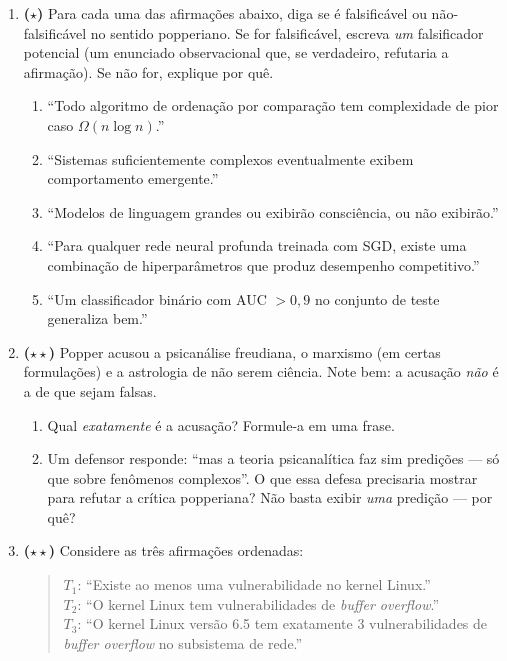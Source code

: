 \documentclass[10pt,a4paper]{extarticle}
\newcommand{\impt}[1]{\textcolor{important}{#1}}
\newcommand{\difi}{$\star$}
\newcommand{\difii}{$\star\star$}
\begin{document}
\begin{enumerate}[label=\textbf{\arabic*.}, leftmargin=*, start=5]

\item \textbf{(\difi)} Para cada uma das afirmações abaixo, diga se é \impt{falsificável} ou \impt{não-falsificável} no sentido popperiano. Se for falsificável, escreva \emph{um} falsificador potencial (um enunciado observacional que, se verdadeiro, refutaria a afirmação). Se não for, explique por quê.

\begin{enumerate}[label=(\alph*)]
    \item ``Todo algoritmo de ordenação por comparação tem complexidade de pior caso $\Omega(n \log n)$.''
    \item ``Sistemas suficientemente complexos eventualmente exibem comportamento emergente.''
    \item ``Modelos de linguagem grandes ou exibirão consciência, ou não exibirão.''
    \item ``Para qualquer rede neural profunda treinada com SGD, existe uma combinação de hiperparâmetros que produz desempenho competitivo.''
    \item ``Um classificador binário com AUC $> 0{,}9$ no conjunto de teste generaliza bem.''
\end{enumerate}

\item \textbf{(\difii)} Popper acusou a psicanálise freudiana, o marxismo (em certas formulações) e a astrologia de não serem ciência. Note bem: a acusação \emph{não} é a de que sejam falsas.

\begin{enumerate}[label=(\alph*)]
    \item Qual \emph{exatamente} é a acusação? Formule-a em uma frase.
    \item Um defensor responde: ``mas a teoria psicanalítica faz sim predições --- só que sobre fenômenos complexos''. O que essa defesa precisaria mostrar para refutar a crítica popperiana? Não basta exibir \emph{uma} predição --- por quê?
\end{enumerate}

\item \textbf{(\difii)} Considere as três afirmações ordenadas:

\begin{quote}
$T_1$: ``Existe ao menos uma vulnerabilidade no kernel Linux.'' \\
$T_2$: ``O kernel Linux tem vulnerabilidades de \emph{buffer overflow}.'' \\
$T_3$: ``O kernel Linux versão 6.5 tem exatamente 3 vulnerabilidades de \emph{buffer overflow} no subsistema de rede.''
\end{quote}


\end{enumerate}
\end{document}
